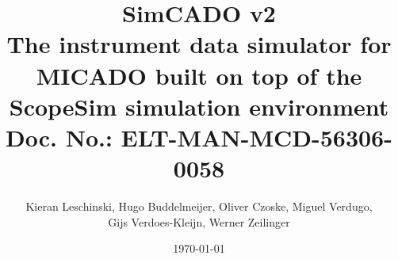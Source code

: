 \documentclass[a4paper,11pt]{article}
\providecommand*{\DUdocumentsubtitle}[1]{{\large #1}}
\begin{document}
\title{SimCADO v2%
  \label{title}%
  \\%
  \DUdocumentsubtitle{The instrument data simulator for MICADO built on top of the ScopeSim simulation environment
    \\ Doc. No.: ELT-MAN-MCD-56306-0058}%
  \label{subtitle}}
\author{Kieran Leschinski,
        Hugo Buddelmeijer,
        Oliver Czoske,
        Miguel Verdugo, \\
        Gijs Verdoes-Kleijn,
        Werner Zeilinger}
\date{\today}

\maketitle

\tableofcontents








\end{document}
